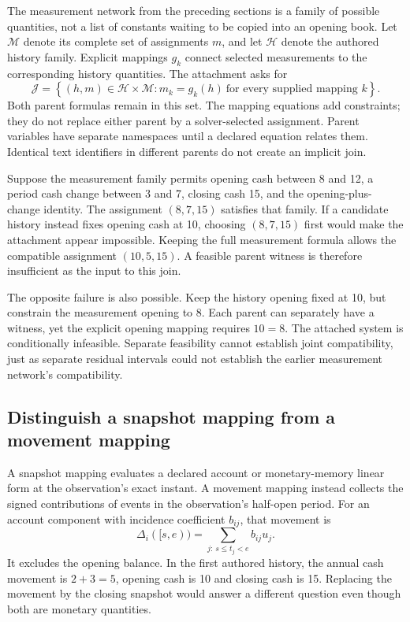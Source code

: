 The measurement network from the preceding sections is a family of possible
quantities, not a list of constants waiting to be copied into an opening book.
Let \(\mathcal M\) denote its complete set of assignments \(m\), and let
\(\mathcal H\) denote the authored history family. Explicit mappings
\(g_k\) connect selected measurements to the corresponding history quantities.
The attachment asks for
\begin{equation}
\label{eq:conditional-history-attachment}
 \mathcal J=\left\{(h,m)\in\mathcal H\times\mathcal M:
 m_k=g_k(h)\ \text{for every supplied mapping }k\right\}.
\end{equation}
Both parent formulas remain in this set. The mapping equations add constraints;
they do not replace either parent by a solver-selected assignment. Parent
variables have separate namespaces until a declared equation relates them.
Identical text identifiers in different parents do not create an implicit join.

Suppose the measurement family permits opening cash between 8 and 12, a period
cash change between 3 and 7, closing cash 15, and the opening-plus-change
identity. The assignment \((8,7,15)\) satisfies that family. If a candidate
history instead fixes opening cash at 10, choosing \((8,7,15)\) first would
make the attachment appear impossible. Keeping the full measurement formula
allows the compatible assignment \((10,5,15)\). A feasible parent witness
is therefore insufficient as the input to this join.

The opposite failure is also possible. Keep the history opening fixed at 10,
but constrain the measurement opening to 8. Each parent can separately have a
witness, yet the explicit opening mapping requires \(10=8\). The attached
system is conditionally infeasible. Separate feasibility cannot establish
joint compatibility, just as separate residual intervals could not establish
the earlier measurement network's compatibility.

\subsection{Distinguish a snapshot mapping from a movement mapping}

A snapshot mapping evaluates a declared account or monetary-memory linear form
at the observation's exact instant. A movement mapping instead collects the
signed contributions of events in the observation's half-open period. For
an account component with incidence coefficient \(b_{ij}\), that movement is
\begin{equation}
\label{eq:conditional-history-movement}
 \Delta_i([s,e))=\sum_{j:\,s\leq t_j<e}b_{ij}u_j.
\end{equation}
It excludes the opening balance. In the first authored history, the annual
cash movement is \(2+3=5\), opening cash is 10 and closing cash is 15.
Replacing the movement by the closing snapshot would answer a different
question even though both are monetary quantities.

